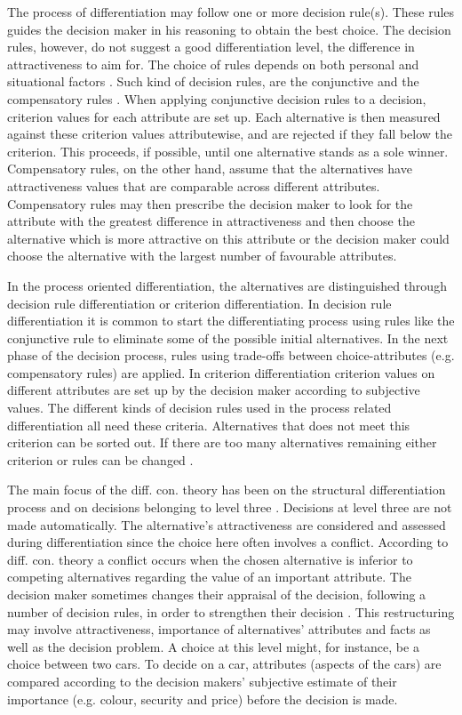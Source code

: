 \documentclass[jou,11pt]{apa6}
\begin{document}
The process of differentiation may follow one or more decision
rule(s).  These rules guides the decision maker in his reasoning to
obtain the best choice.  The decision rules, however, do not suggest a
good differentiation level, the difference in attractiveness to aim
for.  The choice of rules depends on both personal and situational
factors \parencite{svensson92b}.  Such kind of decision rules, are the
conjunctive and the compensatory rules \parencite{Svensson96}.  When
applying conjunctive decision rules to a decision, criterion values
for each attribute are set up.  Each alternative is then measured
against these criterion values attributewise, and are rejected if they
fall below the criterion.  This proceeds, if possible, until one
alternative stands as a sole winner.  Compensatory rules, on the other
hand, assume that the alternatives have attractiveness values that are
comparable across different attributes.  Compensatory rules may then
prescribe the decision maker to look for the attribute with the
greatest difference in attractiveness and then choose the alternative
which is more attractive on this attribute or the decision maker could
choose the alternative with the largest number of favourable
attributes.

In the process oriented differentiation, the alternatives are
distinguished through decision rule differentiation or criterion
differentiation.  In decision rule differentiation it is common to
start the differentiating process using rules like the conjunctive
rule to eliminate some of the possible initial alternatives.  In the
next phase of the decision process, rules using trade-offs between
choice-attributes (e.g. compensatory rules) are applied.  In criterion
differentiation criterion values on different attributes are set up by
the decision maker according to subjective values.  The different
kinds of decision rules used in the process related differentiation
all need these criteria.  Alternatives that does not meet this
criterion can be sorted out.  If there are too many alternatives
remaining either criterion or rules can be changed \parencite{Svensson96}.

 The main focus of the diff. con. theory has been on the structural
 differentiation process and on decisions belonging to level three .
 Decisions at level three are not made automatically. The
 alternative's attractiveness are considered and assessed during
 differentiation since the choice here often involves a conflict.
 According to diff. con. theory a conflict occurs when the chosen
 alternative is inferior to competing alternatives regarding the value
 of an important attribute.  The decision maker sometimes changes
 their appraisal of the decision, following a number of decision
 rules, in order to strengthen their decision \parencite{Svensson95}.
 This restructuring may involve attractiveness, importance of
 alternatives' attributes and facts as well as the decision problem.
 A choice at this level might, for instance, be a choice between two
 cars.  To decide on a car, attributes (aspects of the cars) are
 compared according to the decision makers' subjective estimate of
 their importance (e.g. colour, security and price) before the
 decision is made.
\end{document}
